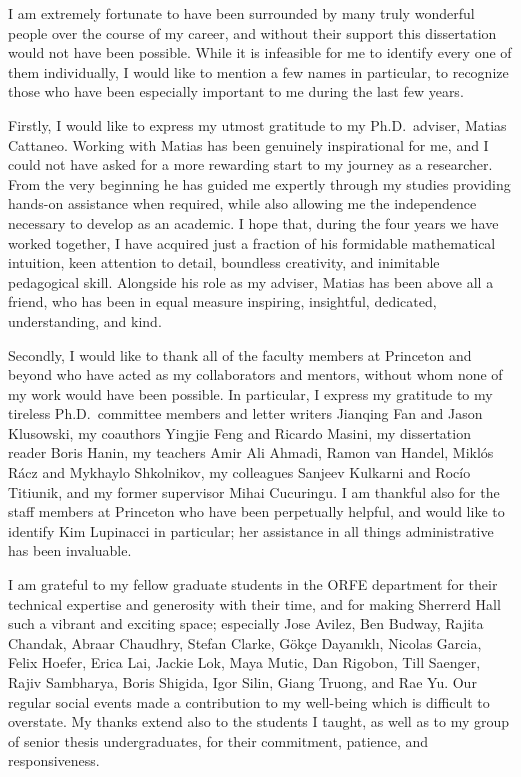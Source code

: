 
I am extremely fortunate to have been surrounded by many truly wonderful people
over the course of my career, and without their support this dissertation would
not have been possible. While it is infeasible for me to identify every one of
them individually, I would like to mention a few names in particular, to
recognize those who have been especially important to me during the last few
years.

Firstly, I would like to express my utmost gratitude to my Ph.D.\ adviser,
Matias Cattaneo. Working with Matias has been genuinely inspirational for me,
and I could not have asked for a more rewarding start to my journey as a
researcher. From the very beginning he has guided me expertly through my
studies providing hands-on assistance when required, while also allowing me the
independence necessary to develop as an academic. I hope that, during the four
years we have worked together, I have acquired just a fraction of his formidable
mathematical intuition, keen attention to detail, boundless creativity, and
inimitable pedagogical skill. Alongside his role as my adviser, Matias has been
above all a friend, who has been in equal measure inspiring,
insightful, dedicated, understanding, and kind.

Secondly, I would like to thank all of the faculty members at Princeton and
beyond who have acted as my collaborators and mentors, without whom none of my
work would have been possible. In particular, I express my gratitude to my
tireless Ph.D.\ committee members and letter writers Jianqing Fan and Jason
Klusowski, my coauthors Yingjie Feng and Ricardo Masini, my dissertation reader
Boris Hanin, my teachers
Amir Ali Ahmadi, Ramon van Handel, Mikl{\'o}s R{\'a}cz and Mykhaylo Shkolnikov,
my colleagues Sanjeev Kulkarni and Roc{\'i}o Titiunik,
and my former supervisor Mihai Cucuringu.
I am thankful also for the staff members at Princeton who have been
perpetually helpful, and would like to identify Kim
Lupinacci in particular; her assistance in all things administrative has been
invaluable.

I am grateful to my fellow graduate students in the ORFE department for their
technical expertise and generosity with their time, and for making Sherrerd
Hall such a vibrant and exciting space; especially Jose Avilez,
Ben Budway, Rajita Chandak,
Abraar Chaudhry, Stefan Clarke, G{\"o}k{\c c}e Dayan{\i}kl{\i}, Nicolas Garcia,
Felix Hoefer, Erica Lai, Jackie Lok, Maya Mutic, Dan Rigobon, Till Saenger,
Rajiv Sambharya, Boris Shigida, Igor Silin, Giang Truong, and Rae Yu. Our
regular social events made a contribution to my well-being which is difficult
to overstate. My thanks extend also to the students I taught, as
well as to my group of senior thesis undergraduates, for their commitment,
patience, and responsiveness.

